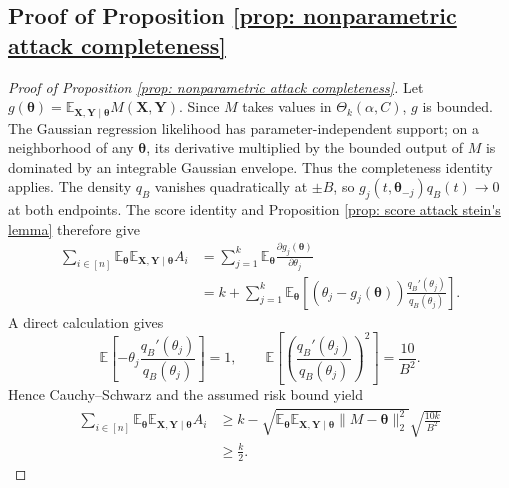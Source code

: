 \documentclass[letterpaper,12pt]{article}
\numberwithin{equation}{section}
\theoremstyle{plain}
\numberwithin{Theorem}{section}
\numberwithin{proposition}{section}
\numberwithin{Lemma}{section}
{
	\theoremstyle{definition}
	\newtheorem{Definition}{Definition}
	\newtheorem{example}{Example}
	\numberwithin{example}{section}
	\newtheorem{fact}{Fact}
	\numberwithin{fact}{section}
	\newtheorem{remark}{Remark}
}
\newcommand{\1}{\mathbbm{1}}
\def\bth{{\boldsymbol{\theta}}}
\def\E{\mathbb{E}}
\begin{document}
\subsection{Proof of Proposition \ref{prop: nonparametric attack completeness}}\label{sec: proof of prop: nonparametric attack completeness}
\begin{proof}[Proof of Proposition \ref{prop: nonparametric attack completeness}]
			{Let $g(\bth)=\E_{\bm X,\bm Y\mid\bth}M(\bm X,\bm Y)$. Since $M$ takes values in $\Theta_k(\alpha,C)$, $g$ is bounded. The Gaussian regression likelihood has parameter-independent support; on a neighborhood of any $\bth$, its derivative multiplied by the bounded output of $M$ is dominated by an integrable Gaussian envelope. Thus the completeness identity applies. The density $q_B$ vanishes quadratically at $\pm B$, so $g_j(t,\bth_{-j})q_B(t)\to0$ at both endpoints. The score identity and Proposition \ref{prop: score attack stein's lemma} therefore give
	\begin{align*}
		\sum_{i\in[n]}\E_\bth\E_{\bm X,\bm Y\mid\bth}A_i
		&=\sum_{j=1}^k\E_\bth\frac{\partial g_j(\bth)}{\partial\theta_j}\\
		&=k+\sum_{j=1}^k\E_\bth\left[(\theta_j-g_j(\bth))\frac{q_B'(\theta_j)}{q_B(\theta_j)}\right].
	\end{align*}
	A direct calculation gives
	\[
	\E\left[-\theta_j\frac{q_B'(\theta_j)}{q_B(\theta_j)}\right]=1,
	\qquad
	\E\left[\left(\frac{q_B'(\theta_j)}{q_B(\theta_j)}\right)^2\right]=\frac{10}{B^2}.
	\]
	Hence Cauchy--Schwarz and the assumed risk bound yield
	\begin{align*}
		\sum_{i\in[n]}\E_\bth\E_{\bm X,\bm Y\mid\bth}A_i
		&\geq k-\sqrt{\E_\bth\E_{\bm X,\bm Y\mid\bth}\|M-\bth\|_2^2}\sqrt{\frac{10k}{B^2}}\\
		&\geq \frac{k}{2}.
	\end{align*}}
\end{proof}
\end{document}
